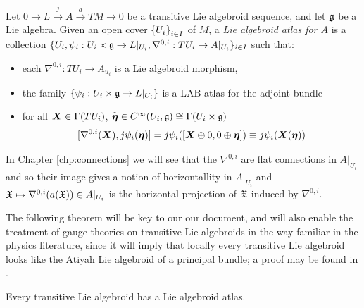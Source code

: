 \begin{definition}%
Let $0 \to L \xrightarrow{j} A \xrightarrow{a} TM \to 0$ be a transitive Lie algebroid sequence, and let $\mathfrak{g}$ be a Lie algebra. Given an open cover $\left\{ U_i \right\}_{i \in I}$ of $M$, a \emph{Lie algebroid atlas for $A$} is a collection $\{U_i, \psi_i:U_i \times \mathfrak{g} \to L|_{U_i}, \nabla^{0,i}: TU_i \to A|_{U_i}\}_{i \in I}$ such that:
    \begin{itemize}
    
    \item each $\nabla^{0,i}: TU_i \to A_{u_i}$ is a Lie algebroid morphism,
    
    \item the family $\left\{ \psi_i:U_i \times \mathfrak{g} \to L|_{U_i} \right\}$ is a LAB atlas for the adjoint bundle 
    
    \item for all $\bm{X} \in \Gamma(TU_i)$, $\widetilde{\bm{\eta}} \in C^\infty(U_i, \mathfrak{g}) \cong \Gamma(U_i \times \mathfrak{g})$
        \begin{align} \label{eqnCompLocal}
            [\nabla^{0,i}(\bm{X}), j\psi_i(\bm{\eta})] = j\psi_i([\bm{X} \oplus 0, 0 \oplus \bm{\eta}]) \equiv j\psi_i(\bm{X}(\bm{\eta})) 
        \end{align}
    
    \end{itemize}
\end{definition}
In Chapter \ref{chp:connections} we will see that the $\nabla^{0,i}$ are flat connections in $A|_{U_i}$ and so their image gives a notion of horizontallity in $A|_{U_i}$ and $ \mathfrak{X} \mapsto \nabla^{0,i}(a(\mathfrak{X})) \in A|_{U_i}$ is the horizontal projection of $\mathfrak{X}$ induced by $\nabla^{0,i}$.

The following theorem will be key to our our document, and will also enable the treatment of gauge theories on transitive Lie algebroids in the way familiar in the physics literature, since it will imply that locally every transitive Lie algebroid looks like the Atiyah Lie algebroid of a principal bundle; a proof may be found in \cite{Mackenzie2005}.
\begin{theorem}
Every transitive Lie algebroid has a Lie algebroid atlas.
\end{theorem}


